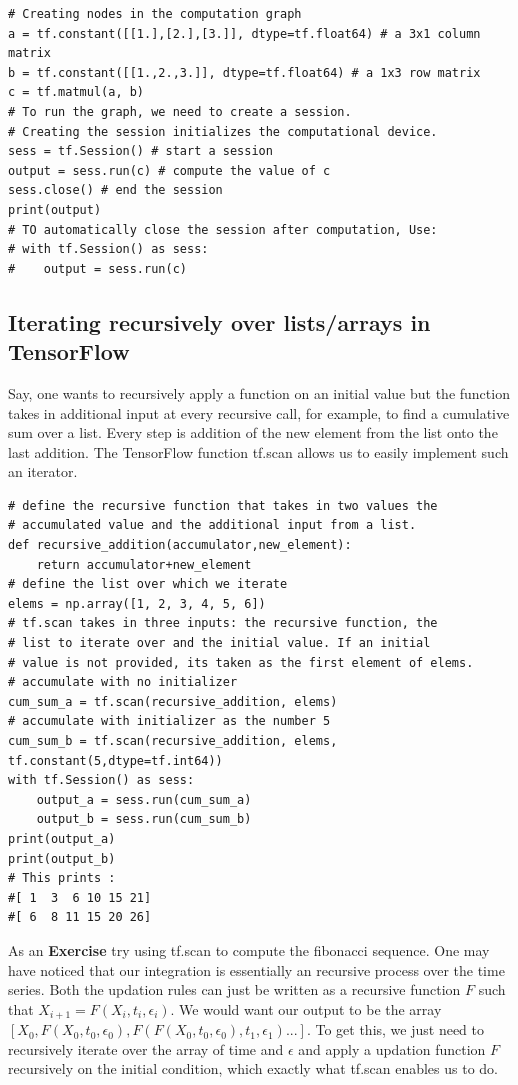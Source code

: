 \documentclass[10pt,letterpaper]{article}
\begin{document}
\begin{verbatim}
# Creating nodes in the computation graph 
a = tf.constant([[1.],[2.],[3.]], dtype=tf.float64) # a 3x1 column matrix 
b = tf.constant([[1.,2.,3.]], dtype=tf.float64) # a 1x3 row matrix 
c = tf.matmul(a, b) 
# To run the graph, we need to create a session.
# Creating the session initializes the computational device.
sess = tf.Session() # start a session
output = sess.run(c) # compute the value of c
sess.close() # end the session
print(output)
# TO automatically close the session after computation, Use:
# with tf.Session() as sess:
#    output = sess.run(c) 
\end{verbatim}

\subsection*{Iterating recursively over lists/arrays in TensorFlow}

Say, one wants to recursively apply a function on an initial value but the function takes in additional input at every recursive call, for example, to find a cumulative sum over a list. Every step is addition of the new element from the list onto the last addition. The TensorFlow function tf.scan allows us to easily implement such an iterator.

\begin{verbatim}
# define the recursive function that takes in two values the
# accumulated value and the additional input from a list.
def recursive_addition(accumulator,new_element):
    return accumulator+new_element
# define the list over which we iterate
elems = np.array([1, 2, 3, 4, 5, 6])
# tf.scan takes in three inputs: the recursive function, the 
# list to iterate over and the initial value. If an initial 
# value is not provided, its taken as the first element of elems.
# accumulate with no initializer
cum_sum_a = tf.scan(recursive_addition, elems) 
# accumulate with initializer as the number 5
cum_sum_b = tf.scan(recursive_addition, elems, tf.constant(5,dtype=tf.int64))
with tf.Session() as sess:
    output_a = sess.run(cum_sum_a)
    output_b = sess.run(cum_sum_b)
print(output_a)
print(output_b)
# This prints :
#[ 1  3  6 10 15 21]
#[ 6  8 11 15 20 26]
\end{verbatim}

As an \textbf{Exercise} try using tf.scan to compute the fibonacci sequence. One may have noticed that our integration is essentially an recursive process over the time series. Both the updation rules can just be written as a recursive function $F$ such that $X_{i+1}=F(X_i,t_i,\epsilon_i)$. We would want our output to be the array $[X_0,F(X_0,t_0,\epsilon_0),F(F(X_0,t_0,\epsilon_0),t_1,\epsilon_1)...]$. To get this, we just need to recursively iterate over the array of time and $\epsilon$ and apply a updation function $F$ recursively on the initial condition, which exactly what tf.scan enables us to do.
\end{document}
